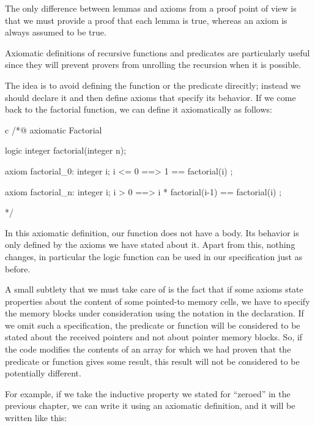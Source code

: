 The only difference between lemmas and axioms from a proof point of view
is that we must provide a proof that each lemma is true, whereas an
axiom is always assumed to be true.





Axiomatic definitions of recursive functions and predicates are
particularly useful since they will prevent provers from unrolling the
recursion when it is possible.



The idea is to avoid defining the function or the predicate
direcitly; instead we should declare it and then define axioms that specify its
behavior. If we come back to the factorial function, we can define it
axiomatically as follows:



\begin{CodeBlock}{c}
/*@
  axiomatic Factorial{
    logic integer factorial(integer n);

    axiom factorial_0:
      \forall integer i; i <= 0 ==> 1 == factorial(i) ;

    axiom factorial_n:
      \forall integer i; i > 0 ==> i * factorial(i-1) == factorial(i) ;
  }
*/
\end{CodeBlock}



In this axiomatic definition, our function does not have a body. Its
behavior is only defined by the axioms we have stated about it.
Apart from this, nothing changes, in particular the logic function can
be used in our specification just as before.



A small subtlety that we must take care of is the fact that if some
axioms state properties about the content of some pointed-to memory cells,
we have to specify the memory blocks under consideration using the 
notation in the declaration. If we omit such a specification, the
predicate or function will be considered to be stated about the received
pointers and not about pointer memory blocks. So, if the code modifies
the contents of an array for which we had proven that the predicate or
function gives some result, this result will not be considered to be
potentially different.



For example, if we take the inductive property we stated for ``zeroed''
in the previous chapter, we can write it using an axiomatic definition, and it
will be written like this:




